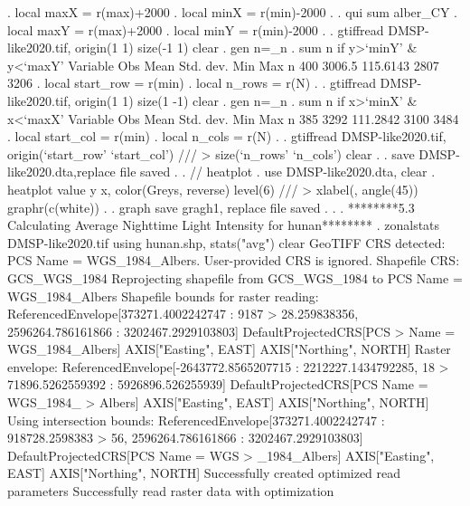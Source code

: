 . local maxX = r(max)+2000
{\smallskip}
. local minX = r(min)-2000
{\smallskip}
. 
. qui sum alber_CY
{\smallskip}
. local maxY = r(max)+2000
{\smallskip}
. local minY = r(min)-2000
{\smallskip}
. 
. gtiffread DMSP-like2020.tif, origin(1 1) size(-1 1) clear 
{\smallskip}
. gen n=_n
{\smallskip}
. sum n if y>`minY' \& y<`maxY'
{\smallskip}
    Variable {\VBAR}        Obs        Mean    Std. dev.       Min        Max
           n {\VBAR}        400      3006.5    115.6143       2807       3206
{\smallskip}
. local start_row = r(min)
{\smallskip}
. local n_rows = r(N)
{\smallskip}
. 
. gtiffread DMSP-like2020.tif, origin(1 1) size(1 -1) clear 
{\smallskip}
. gen n=_n
{\smallskip}
. sum n if x>`minX' \& x<`maxX'
{\smallskip}
    Variable {\VBAR}        Obs        Mean    Std. dev.       Min        Max
           n {\VBAR}        385        3292    111.2842       3100       3484
{\smallskip}
. local start_col = r(min)
{\smallskip}
. local n_cols = r(N)
{\smallskip}
. 
. gtiffread DMSP-like2020.tif, origin(`start_row' `start_col') ///
>                              size(`n_rows' `n_cols') clear
{\smallskip}
. 
. save DMSP-like2020.dta,replace
file{} saved
{\smallskip}
. 
. // heatplot
. use DMSP-like2020.dta, clear
{\smallskip}
. heatplot value y x, color(Greys, reverse) level(6) ///
>                 xlabel(, angle(45)) graphr(c(white))
{\smallskip}
. 
. graph save gragh1, replace
file {} saved
{\smallskip}
. 
. 
. ********5.3 Calculating Average Nighttime Light Intensity for hunan********
. zonalstats DMSP-like2020.tif using hunan.shp, stats("avg") clear
GeoTIFF CRS detected: PCS Name = WGS_1984_Albers. User-provided CRS is ignored.
Shapefile CRS: GCS_WGS_1984
Reprojecting shapefile from GCS_WGS_1984 to PCS Name = WGS_1984_Albers
Shapefile bounds for raster reading: ReferencedEnvelope[373271.4002242747 : 9187
> 28.259838356, 2596264.786161866 : 3202467.2929103803] DefaultProjectedCRS[PCS 
> Name = WGS_1984_Albers] AXIS["Easting", EAST] AXIS["Northing", NORTH]
Raster envelope: ReferencedEnvelope[-2643772.8565207715 : 2212227.1434792285, 18
> 71896.5262559392 : 5926896.526255939] DefaultProjectedCRS[PCS Name = WGS_1984_
> Albers] AXIS["Easting", EAST] AXIS["Northing", NORTH]
Using intersection bounds: ReferencedEnvelope[373271.4002242747 : 918728.2598383
> 56, 2596264.786161866 : 3202467.2929103803] DefaultProjectedCRS[PCS Name = WGS
> _1984_Albers] AXIS["Easting", EAST] AXIS["Northing", NORTH]
Successfully created optimized read parameters
Successfully read raster data with optimization
